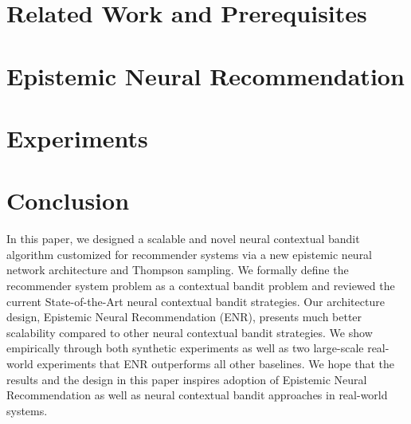 \documentclass[sigconf,arxiv]{acmart}
\begin{document}
\section{Related Work and Prerequisites}


\section{Epistemic Neural Recommendation}


\section{Experiments}



\section{Conclusion}
In this paper, we designed a scalable and novel neural contextual bandit algorithm customized for recommender systems via a new epistemic neural network architecture and Thompson sampling. We formally define the recommender system problem as a contextual bandit problem and reviewed the current State-of-the-Art neural contextual bandit strategies. Our architecture design, Epistemic Neural Recommendation (ENR), presents much better scalability compared to other neural contextual bandit strategies. We show empirically through both synthetic experiments as well as two large-scale real-world experiments that ENR outperforms all other baselines. We hope that the results and the design in this paper inspires adoption of Epistemic Neural Recommendation as well as neural contextual bandit approaches in real-world systems.



\end{document}
